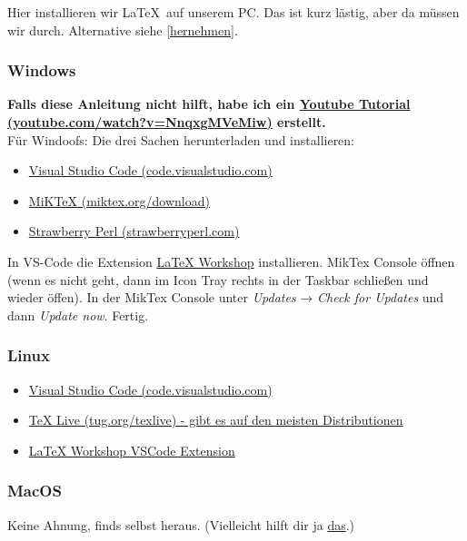 \documentclass[titlepage]{article}
\begin{document}
Hier installieren wir \LaTeX\ auf unserem PC. 
Das ist kurz lästig, aber da müssen wir durch. Alternative siehe \autoref{hernehmen}.

\subsubsection{Windows}

\textbf{Falls diese Anleitung nicht hilft, habe ich ein \href{https://www.youtube.com/watch?v=NnqxgMVeMiw}{Youtube Tutorial (youtube.com/watch?v=NnqxgMVeMiw)} erstellt.}\\

Für Windoofs: Die drei Sachen herunterladen und installieren: 
\begin{itemize}
    \item \href{https://code.visualstudio.com/}{Visual Studio Code (code.visualstudio.com)}
    \item \href{https://miktex.org/download}{MiKTeX (miktex.org/download)}
    \item \href{https://strawberryperl.com/}{Strawberry Perl (strawberryperl.com)}
\end{itemize}
In VS-Code die Extension \href{https://open-vsx.org/extension/James-Yu/latex-workshop}{LaTeX Workshop} installieren. MikTex Console öffnen (wenn es nicht geht, dann im Icon Tray rechts in der Taskbar schließen und wieder öffen).
In der MikTex Console unter \textit{Updates} → \textit{Check for Updates} und dann \textit{Update now}. Fertig. 
\subsubsection{Linux}
\begin{itemize}
    \item \href{https://code.visualstudio.com/}{Visual Studio Code (code.visualstudio.com)}
    \item \href{https://tug.org/texlive}{TeX Live (tug.org/texlive) - gibt es auf den meisten Distributionen}
    \item \href{https://open-vsx.org/extension/James-Yu/latex-workshop}{LaTeX Workshop VSCode Extension}
\end{itemize}

\subsubsection{MacOS}
Keine Ahnung, finds selbst heraus.
(Vielleicht hilft dir ja \href{https://tex.stackexchange.com/questions/220/i-want-to-start-using-latex-on-mac-os-x-where-do-i-start}{das}.)
\end{document}
